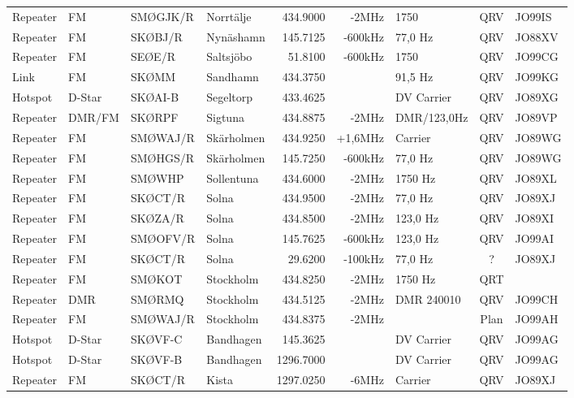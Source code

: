 \begin{landscape}
\begin{longtable}{llllrrlcl}
Repeater & FM     & SMØGJK/R & Norrtälje   & 434.9000  & -2MHz   & 1750           & QRV  & JO99IS \\
Repeater & FM     & SKØBJ/R  & Nynäshamn   & 145.7125  & -600kHz & 77,0 Hz        & QRV  & JO88XV \\
Repeater & FM     & SEØE/R   & Saltsjöbo   & 51.8100   & -600kHz & 1750           & QRV  & JO99CG \\
Link     & FM     & SKØMM    & Sandhamn    & 434.3750  &         & 91,5 Hz        & QRV  & JO99KG \\
Hotspot  & D-Star & SKØAI-B  & Segeltorp   & 433.4625  &         & DV Carrier     & QRV  & JO89XG \\
Repeater & DMR/FM & SKØRPF   & Sigtuna     & 434.8875  & -2MHz   & DMR/123,0Hz    & QRV  & JO89VP \\
Repeater & FM     & SMØWAJ/R & Skärholmen  & 434.9250  & +1,6MHz & Carrier        & QRV  & JO89WG \\
Repeater & FM     & SMØHGS/R & Skärholmen  & 145.7250  & -600kHz & 77,0 Hz        & QRV  & JO89WG \\
Repeater & FM     & SMØWHP   & Sollentuna  & 434.6000  & -2MHz   & 1750 Hz        & QRV  & JO89XL \\
Repeater & FM     & SKØCT/R  & Solna       & 434.9500  & -2MHz   & 77,0 Hz        & QRV  & JO89XJ \\
Repeater & FM     & SKØZA/R  & Solna       & 434.8500  & -2MHz   & 123,0 Hz       & QRV  & JO89XI \\
Repeater & FM     & SMØOFV/R & Solna       & 145.7625  & -600kHz & 123,0 Hz       & QRV  & JO99AI \\
Repeater & FM     & SKØCT/R  & Solna       & 29.6200   & -100kHz & 77,0 Hz        & ?    & JO89XJ \\
Repeater & FM     & SMØKOT   & Stockholm   & 434.8250  & -2MHz   & 1750 Hz        & QRT  &        \\
Repeater & DMR    & SMØRMQ   & Stockholm   & 434.5125  & -2MHz   & DMR 240010     & QRV  & JO99CH \\
Repeater & FM     & SMØWAJ/R & Stockholm   & 434.8375  & -2MHz   &                & Plan & JO99AH \\
Hotspot  & D-Star & SKØVF-C  & Bandhagen   & 145.3625  &         & DV Carrier     & QRV  & JO99AG \\
Hotspot  & D-Star & SKØVF-B  & Bandhagen   & 1296.7000 &         & DV Carrier     & QRV  & JO99AG \\
Repeater & FM     & SKØCT/R  & Kista       & 1297.0250 & -6MHz   & Carrier        & QRV  & JO89XJ \\

\end{longtable}
\end{landscape}

